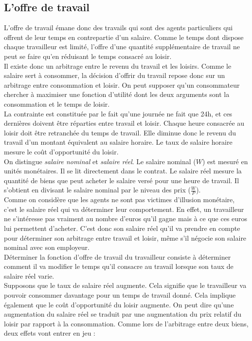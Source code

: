 \documentclass[10pt]{book}
\begin{document}
\subsection{L'offre de travail}
L'offre de travail émane donc des travails qui sont des agents particuliers qui offrent de leur temps en contrepartie d'un salaire. Comme le temps dont dispose chaque travailleur est limité, l'offre d'une quantité supplémentaire de travail ne peut se faire qu'en réduisant le temps consacré au loisir. \\
Il existe donc un arbitrage entre le revenu du travail et les loisirs. Comme le salaire sert à consommer, la décision d'offrir du travail repose donc sur un arbitrage entre consommation et loisir. On peut supposer qu'un consommateur chercher à maximiser une fonction d'utilité dont les deux arguments sont la consommation et le temps de loisir. \\
La contrainte est constituée par le fait qu'une journée ne fait que 24h, et ces dernières doivent être réparties entre travail et loisir. Chaque heure consacrée au loisir doit être retranchée du temps de travail. Elle diminue donc le revenu du travail d'un montant équivalent au salaire horaire. Le taux de salaire horaire mesure le coût d'opportunité du loisir.  \\
On distingue \textit{salaire nominal} et \textit{salaire réel}. Le salaire nominal ($W$) est mesuré en unités monétaires. Il se lit directement dans le contrat. Le salaire réel mesure la quantité de biens que peut acheter le salaire versé pour une heure de travail. Il s'obtient en divisant le salaire nominal par le niveau des prix ($\frac{W}{P}$). \\
Comme on considère que les agents ne sont pas victimes d'illusion monétaire, c'est le salaire réel qui va déterminer leur comportement. En effet, un travailleur ne s'intéresse pas vraiment au nombre d'euros qu'il gagne mais à ce que ces euros lui permettent d'acheter. C'est donc son salaire réel qu'il va prendre en compte pour déterminer son arbitrage entre travail et loisir, même s'il négocie son salaire nominal avec son employeur. \\
Déterminer la fonction d'offre de travail du travailleur consiste à déterminer comment il va modifier le temps qu'il consacre au travail lorsque son taux de salaire réel varie. \\
Supposons que le taux de salaire réel augmente. Cela signifie que le travailleur va pouvoir consommer davantage pour un temps de travail donné. Cela implique également que le coût d'opportunité du loisir augmente. On peut dire qu'une augmentation du salaire réel se traduit par une augmentation du prix relatif du loisir par rapport à la consommation. Comme lors de l'arbitrage entre deux biens, deux effets vont entrer en jeu : 
\end{document}
